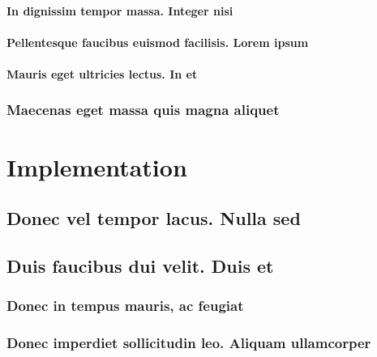 \documentclass[%
  german,%
  exercise,%
  oneside,%
]{iswartcl}
\begin{document}
\lipsum[1-8]

\subsubsection{In dignissim tempor massa. Integer nisi}

\lipsum[1-8]

\subsubsection{Pellentesque faucibus euismod facilisis. Lorem ipsum}

\lipsum[1-8]

\subsubsection{Mauris eget ultricies lectus. In et}

\lipsum[1-8]

\subsection{Maecenas eget massa quis magna aliquet}

\lipsum[1-8]





\chapter{Implementation}

\lipsum[1-8]

\section{Donec vel tempor lacus. Nulla sed}

\lipsum[1-8]

\section{Duis faucibus dui velit. Duis et}

\lipsum[1-8]

\subsection{Donec in tempus mauris, ac feugiat}

\lipsum[1-8]

\subsection{Donec imperdiet sollicitudin leo. Aliquam ullamcorper}
\end{document}
